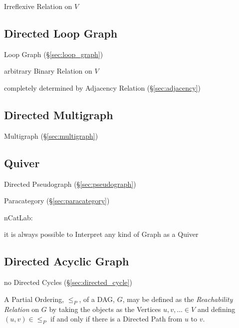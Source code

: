 Irreflexive Relation on $V$



\subsection{Directed Loop Graph}\label{sec:directed_loop_graph}

Loop Graph (\S\ref{sec:loop_graph})

arbitrary Binary Relation on $V$

completely determined by Adjacency Relation (\S\ref{sec:adjacency})



\subsection{Directed Multigraph}\label{sec:directed_multigraph}

Multigraph (\S\ref{sec:multigraph})



\subsection{Quiver}\label{sec:quiver}

Directed Pseudograph (\S\ref{sec:pseudograph})

Paracategory (\S\ref{sec:paracategory})

nCatLab:

it is always possible to Interpret any kind of Graph as a Quiver



\subsection{Directed Acyclic Graph}\label{sec:dag}

no Directed Cycles (\S\ref{sec:directed_cycle})

A Partial Ordering, $\leq_P$, of a DAG, $G$, may be defined as the
\emph{Reachability Relation} on $G$ by taking the objects as the
Vertices $u,v,... \in V$ and defining $(u,v) \in \leq_P$ if and only
if there is a Directed Path from $u$ to $v$.

